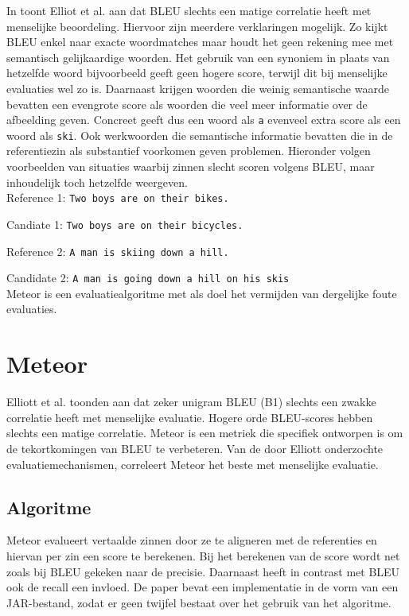 In \cite{Elliott2014} toont Elliot et al. aan dat BLEU slechts een matige correlatie heeft met menselijke beoordeling.
Hiervoor zijn meerdere verklaringen mogelijk. Zo kijkt BLEU enkel naar exacte woordmatches maar houdt het geen rekening mee met semantisch gelijkaardige woorden. Het gebruik van een synoniem in plaats van hetzelfde woord bijvoorbeeld geeft geen hogere score, terwijl dit bij menselijke evaluaties wel zo is. Daarnaast krijgen woorden die weinig semantische waarde bevatten een evengrote score als woorden die veel meer informatie over de afbeelding geven. Concreet geeft dus een woord als \texttt{a} evenveel extra score als een woord als \texttt{ski}. Ook werkwoorden die semantische informatie bevatten die in de referentiezin als substantief voorkomen geven problemen. Hieronder volgen voorbeelden van situaties waarbij zinnen slecht scoren volgens BLEU, maar inhoudelijk toch hetzelfde weergeven.
\\

Reference 1: \texttt{Two boys are on their bikes.}

Candiate 1: \texttt{Two boys are on their bicycles.}

Reference 2: \texttt{A man is skiing down a hill.}

Candidate 2: \texttt{A man is going down a hill on his skis}
\\

Meteor is een evaluatiealgoritme met als doel het vermijden van dergelijke foute evaluaties.

\section{Meteor}
Elliott et al.\cite{Elliott2014} toonden aan dat zeker unigram BLEU (B1) slechts een zwakke correlatie heeft met menselijke evaluatie. Hogere orde BLEU-scores hebben slechts een matige correlatie. Meteor is een metriek die specifiek ontworpen is om de tekortkomingen van BLEU te verbeteren. Van de door Elliott onderzochte evaluatiemechanismen, correleert Meteor het beste met menselijke evaluatie.

\subsection{Algoritme}
Meteor\cite{Denkowski2007a} evalueert vertaalde zinnen door ze te aligneren met de referenties en hiervan per zin een score te berekenen. Bij het berekenen van de score wordt net zoals bij BLEU gekeken naar de precisie. Daarnaast heeft in contrast met BLEU ook de recall een invloed. De paper bevat een implementatie in de vorm van een JAR-bestand, zodat er geen twijfel bestaat over het gebruik van het algoritme.

